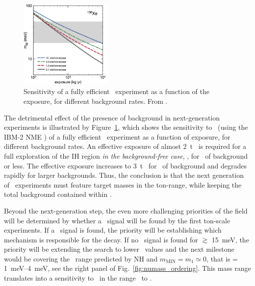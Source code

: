 \begin{figure}[hb!]
\centering
\includegraphics[width=0.4\textwidth]{img/sensi-xenon.png}
\caption{\small Sensitivity of a fully efficient \XE\ experiment as a function of the exposure, for different background rates. From \cite{Martin-Albo:2015dza}.}
\label{fig.Xe}
\end{figure}

The detrimental effect of the presence of background in next-generation experiments is illustrated by Figure~\ref{fig.Xe}, which shows the sensitivity to \mbb\ (using the IBM-2 NME \cite{Barea:2013bz}) of a fully efficient \XE\ experiment as a function of exposure, for different background rates.  An effective exposure of almost \SI{2}{\tonne\yr} is required for a full exploration of the IH region {\em in the background-free case}, \eg, for \BackgroundFreeLimit\ of background or less. The effective exposure increases to \SI{3}{\tonne\yr} for \AlmostBackgroundFreeLimit\ of background and degrades rapidly for larger backgrounds.  Thus, the conclusion is that the next generation of \bbonu\ experiments must feature target masses in the ton-range, while keeping the total background contained within \AlmostBackgroundFreeRequirement. 

Beyond the next-generation step, the even more challenging priorities of the field will be determined by whether a \bbonu\ signal will be found by the first ton-scale experiments. If a \bbonu\ signal is found, the priority will be establishing which mechanism is responsible for the decay. 
 If no \bbonu\ signal is found for \mbb $\gtrsim$ \SI{15}{\meV}, the priority will be extending the search to lower \mbb\ values and the next milestone would be covering the \mbb\ range predicted by NH and $m_\mathrm{MIN}=m_1\simeq 0$, that is \mbb = \SIrange{1}{4}{\meV}, see the right panel of Fig.~\ref{fig:numass_ordering}. This mass range translates into a sensitivity to \Tonu\  in the range \NHTl\ to \NHTz. 

